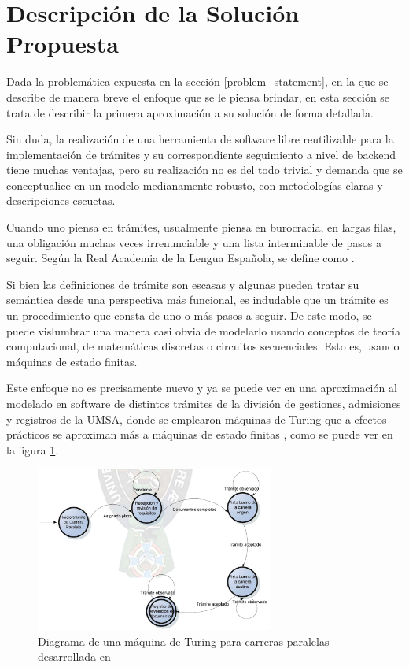 \section{Descripción de la Solución Propuesta}
Dada la problemática expuesta en la sección \ref{problem_statement}, en la que
se describe de manera breve el enfoque que se le piensa brindar, en esta sección
se trata de describir la primera aproximación a su solución de forma detallada.

Sin duda, la realización de una herramienta de software libre reutilizable para
la implementación de trámites y su correspondiente seguimiento a nivel de
backend tiene muchas ventajas, pero su realización no es del todo trivial y
demanda que se conceptualice en un modelo medianamente robusto, con metodologías
claras y descripciones escuetas.

Cuando uno piensa en trámites, usualmente piensa en burocracia, en largas filas,
una obligación muchas veces irrenunciable y una lista interminable de pasos a
seguir. Según la Real Academia de la Lengua Española, se define como  \parencite{asaleDiccionarioLenguaEspanola}.

Si bien las definiciones de trámite son escasas y algunas pueden tratar su
semántica desde una perspectiva más funcional, es indudable que un trámite es un
procedimiento que consta de uno o más pasos a seguir. De este modo, se puede
vislumbrar una manera casi obvia de modelarlo usando conceptos de teoría
computacional, de matemáticas discretas o circuitos secuenciales. Esto es,
usando máquinas de estado finitas.

Este enfoque no es precisamente nuevo y ya se puede ver en una aproximación al
modelado en software de distintos trámites de la división de gestiones,
admisiones y registros de la UMSA, donde se emplearon máquinas de Turing que a
efectos prácticos se aproximan más a máquinas de estado finitas
\parencite{nachoSISTEMACONTROLTRAMITES2007}, como se puede ver en la figura
\ref{fig:nachocarreraparalela}.

\begin{figure}
	\centering
	\includegraphics[width=0.7\textwidth]{assets/carreraparalelanacho}
	\caption{Diagrama de una máquina de Turing para carreras paralelas
		desarrollada en \cite{nachoSISTEMACONTROLTRAMITES2007}}
	\label{fig:nachocarreraparalela}
\end{figure}

